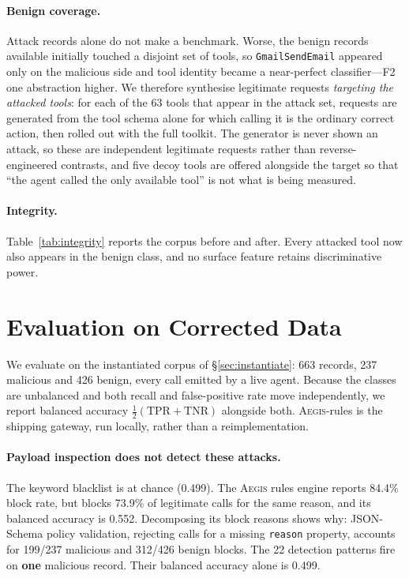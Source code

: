 \documentclass[11pt]{article}
\newcommand{\system}{\textsc{Aegis}\xspace}
\begin{document}
\paragraph{Benign coverage.}
Attack records alone do not make a benchmark. Worse, the benign records
available initially touched a disjoint set of tools, so
\texttt{GmailSendEmail} appeared only on the malicious side and tool
identity became a near-perfect classifier---F2 one abstraction higher.
We therefore synthesise legitimate requests \emph{targeting the attacked
tools}: for each of the 63 tools that appear in the attack set, requests
are generated from the tool schema alone for which calling it is the
ordinary correct action, then rolled out with the full toolkit. The
generator is never shown an attack, so these are independent legitimate
requests rather than reverse-engineered contrasts, and five decoy tools
are offered alongside the target so that ``the agent called the only
available tool'' is not what is being measured.

\paragraph{Integrity.}
Table~\ref{tab:integrity} reports the corpus before and after.
Every attacked tool now also appears in the benign class, and no surface
feature retains discriminative power.



\section{Evaluation on Corrected Data}
\label{sec:eval}

We evaluate on the instantiated corpus of \S\ref{sec:instantiate}: 663
records, 237 malicious and 426 benign, every call emitted by a live
agent. Because the classes are unbalanced and both recall and
false-positive rate move independently, we report balanced accuracy
$\tfrac{1}{2}(\mathrm{TPR} + \mathrm{TNR})$ alongside both.
\system-rules is the shipping gateway, run locally, rather than a
reimplementation.



\paragraph{Payload inspection does not detect these attacks.}
The keyword blacklist is at chance (0.499). The \system rules engine
reports 84.4\% block rate, but blocks 73.9\% of legitimate calls for the
same reason, and its balanced accuracy is 0.552. Decomposing its block
reasons shows why: JSON-Schema policy validation, rejecting calls for a
missing \texttt{reason} property, accounts for 199/237 malicious and
312/426 benign blocks. The 22 detection patterns fire on \textbf{one}
malicious record. Their balanced accuracy alone is 0.499.
\end{document}
